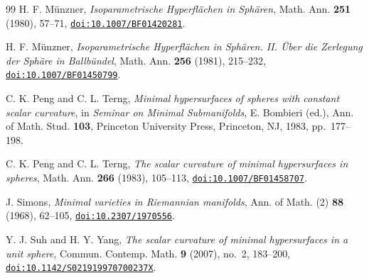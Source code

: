 \documentclass[11pt,a4paper]{amsart}
\numberwithin{equation}{section}
\theoremstyle{definition}
\theoremstyle{remark}
\begin{document}
\begin{thebibliography}{99}
H. F. M\"unzner,
\emph{Isoparametrische Hyperfl\"achen in Sph\"aren},
Math. Ann. \textbf{251} (1980), 57--71,
\href{https://doi.org/10.1007/BF01420281}{\nolinkurl{doi:10.1007/BF01420281}}.

H. F. M\"unzner,
\emph{Isoparametrische Hyperfl\"achen in Sph\"aren. II.
\"Uber die Zerlegung der Sph\"are in Ballb\"undel},
Math. Ann. \textbf{256} (1981), 215--232,
\href{https://doi.org/10.1007/BF01450799}{\nolinkurl{doi:10.1007/BF01450799}}.

C. K. Peng and C. L. Terng,
\emph{Minimal hypersurfaces of spheres with constant scalar curvature},
in \emph{Seminar on Minimal Submanifolds}, E. Bombieri (ed.),
Ann. of Math. Stud. \textbf{103},
Princeton University Press, Princeton, NJ, 1983, pp.~177--198.

C. K. Peng and C. L. Terng,
\emph{The scalar curvature of minimal hypersurfaces in spheres},
Math. Ann. \textbf{266} (1983), 105--113,
\href{https://doi.org/10.1007/BF01458707}{\nolinkurl{doi:10.1007/BF01458707}}.

J. Simons,
\emph{Minimal varieties in Riemannian manifolds},
Ann. of Math. (2) \textbf{88} (1968), 62--105,
\href{https://doi.org/10.2307/1970556}{\nolinkurl{doi:10.2307/1970556}}.

Y. J. Suh and H. Y. Yang,
\emph{The scalar curvature of minimal hypersurfaces in a unit sphere},
Commun. Contemp. Math. \textbf{9} (2007), no.~2, 183--200,
\href{https://doi.org/10.1142/S021919970700237X}{\nolinkurl{doi:10.1142/S021919970700237X}}.
\end{thebibliography}
\end{document}
